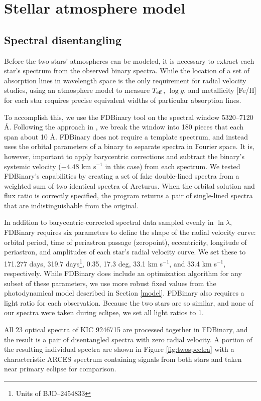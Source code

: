 \section{Stellar atmosphere model}\label{atm}

\subsection{Spectral disentangling}\label{disentangle}
Before the two stars' atmospheres can be modeled, it is necessary to extract each star's spectrum from the observed binary spectra. While the location of a set of absorption lines in wavelength space is the only requirement for radial velocity studies, using an atmosphere model to measure $T_{\rm{eff}}$, $\log g$, and metallicity [Fe/H] for each star requires precise equivalent widths of particular absorption lines.

To accomplish this, we use the FDBinary tool \citep{ili04} on the spectral window 5320--7120 \AA. Following the approach in \citet{bec14}, we break the window into 180 pieces that each span about 10 \AA. FDBinary does not require a template spectrum, and instead uses the orbital parameters of a binary to separate spectra in Fourier space. It is, however, important to apply barycentric corrections and subtract the binary's systemic velocity ($-4.48$ km s$^{-1}$ in this case) from each spectrum. We tested FDBinary's capabilities by creating a set of fake double-lined spectra from a weighted sum of two identical spectra of Arcturus. When the orbital solution and flux ratio is correctly specified, the program returns a pair of single-lined spectra that are indistinguishable from the original.

In addition to barycentric-corrected spectral data sampled evenly in $\ln \lambda$, FDBinary requires six parameters to define the shape of the radial velocity curve: orbital period, time of periastron passage (zeropoint), eccentricity, longitude of periastron, and amplitudes of each star's radial velocity curve. We set these to 171.277 days, 319.7 days\footnote{Units of BJD--2454833}, 0.35, 17.3 deg, 33.1 km s$^{-1}$, and 33.4 km s$^{-1}$, respectively. While FDBinary does include an optimization algorithm for any subset of these parameters, we use more robust fixed values from the photodynamical model described in Section \ref{model}. FDBinary also requires a light ratio for each observation. Because the two stars are so similar, and none of our spectra were taken during eclipse, we set all light ratios to 1.

All 23 optical spectra of KIC 9246715 are processed together in FDBinary, and the result is a pair of disentangled spectra with zero radial velocity. A portion of the resulting individual spectra are shown in Figure \ref{fig:twospectra} with a characteristic ARCES spectrum containing signals from both stars and taken near primary eclipse for comparison.
